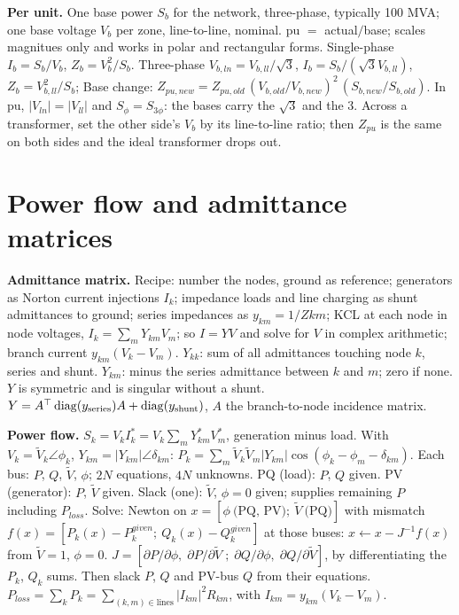 \documentclass{article}
\newcommand{\abs}[1]{\lvert#1\rvert}
\begin{document}
\textbf{Per unit.}
One base power $S_b$ for the network, three-phase, typically 100 MVA; one base voltage $V_b$ per zone, line-to-line, nominal.
pu $=$ actual$/$base; scales magnitues only and works in polar and rectangular forms.
Single-phase $I_b = S_b/V_b$, $Z_b = V_b^2/S_b$.
Three-phase $V_{b,ln} = V_{b,ll}/\sqrt3$, $I_b = S_b/(\sqrt3 V_{b,ll})$, $Z_b = V_{b,ll}^2/S_b$; 
Base change: $Z_{pu,new} = Z_{pu,old}\,(V_{b,old}/V_{b,new})^2\,(S_{b,new}/S_{b,old})$.
In pu, $\abs{V_{ln}} = \abs{V_{ll}}$ and $S_\phi = S_{3\phi}$: the bases carry the $\sqrt3$ and the 3.
Across a transformer, set the other side's $V_b$ by its line-to-line ratio; then $Z_{pu}$ is the same on both sides and the ideal transformer drops out.




\section{Power flow and admittance matrices}
\textbf{Admittance matrix.}
Recipe: number the nodes, ground as reference; generators as Norton current injections $I_k$; impedance loads and line charging as shunt admittances to ground; series impedances as $y_{km} = 1/Z{km}$; KCL at each node in node voltages, $I_k = \sum_m Y_{km}V_m$; so $I = YV$ and solve for $V$ in complex arithmetic; branch current $y_{km}(V_k - V_m)$.
$Y_{kk}$: sum of all admittances touching node $k$, series and shunt.
$Y_{km}$: minus the series admittance between $k$ and $m$; zero if none.
$Y$ is symmetric and is singular without a shunt.
$Y = A^\top\operatorname{diag}(y_{\rm series})A + \operatorname{diag}(y_{\rm shunt})$, $A$ the branch-to-node incidence matrix.

\textbf{Power flow.}
$S_k = V_k I_k^* = V_k\sum_m Y_{km}^* V_m^*$, generation minus load.
With $V_k = \tilde V_k\angle\phi_k$, $Y_{km} = \abs{Y_{km}}\angle\delta_{km}$:
$P_k = \sum_m \tilde V_k\tilde V_m\abs{Y_{km}}\cos(\phi_k - \phi_m - \delta_{km})$.
Each bus: $P$, $Q$, $\tilde V$, $\phi$; $2N$ equations, $4N$ unknowns.
PQ (load): $P$, $Q$ given. PV (generator): $P$, $\tilde V$ given. Slack (one): $\tilde V$, $\phi = 0$ given; supplies remaining $P$ including $P_{loss}$.
Solve: Newton on $x = [\phi\ \text{(PQ, PV)};\ \tilde V\ \text{(PQ)}]$ with mismatch $f(x) = [P_k(x) - P_k^{given};\ Q_k(x) - Q_k^{given}]$ at those buses: $x \leftarrow x - J^{-1}f(x)$ from $\tilde V = 1$, $\phi = 0$.
$J = [\partial P/\partial\phi,\; \partial P/\partial\tilde V\; ;\; \partial Q/\partial\phi,\; \partial Q/\partial\tilde V]$, by differentiating the $P_k$, $Q_k$ sums.
Then slack $P$, $Q$ and PV-bus $Q$ from their equations.
$P_{loss} = \sum_k P_k = \sum_{(k,m)\in\text{lines}}\abs{I_{km}}^2 R_{km}$, with $I_{km} = y_{km}(V_k - V_m)$.
\end{document}
